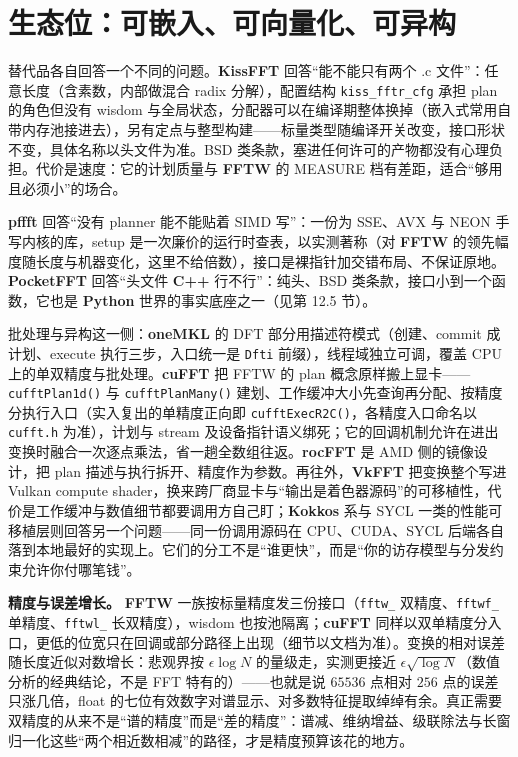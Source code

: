 \documentclass[12pt,a4paper,fontset=fandol]{ctexbook}
\newcommand{\Fn}[1]{\texttt{#1()}}
\newcommand{\Tp}[1]{\texttt{#1}}
\newcommand{\Lib}[1]{\textbf{#1}}
\newcommand{\Lang}[1]{\textsf{\bfseries #1}}
\newcommand{\CPP}{\Lang{C++}}
\newcommand{\PY}{\Lang{Python}}
\begin{document}
\section{生态位：可嵌入、可向量化、可异构}

替代品各自回答一个不同的问题。\Lib{KissFFT} 回答``能不能只有两个 .c 文件''：任意长度（含素数，内部做混合 radix 分解），配置结构 \Tp{kiss\_fftr\_cfg} 承担 plan 的角色但没有 wisdom 与全局状态，分配器可以在编译期整体换掉（嵌入式常用自带内存池接进去），另有定点与整型构建——标量类型随编译开关改变，接口形状不变，具体名称以头文件为准。BSD 类条款，塞进任何许可的产物都没有心理负担。代价是速度：它的计划质量与 \Lib{FFTW} 的 MEASURE 档有差距，适合``够用且必须小''的场合。

\Lib{pffft} 回答``没有 planner 能不能贴着 SIMD 写''：一份为 SSE、AVX 与 NEON 手写内核的库，setup 是一次廉价的运行时查表，以实测著称（对 \Lib{FFTW} 的领先幅度随长度与机器变化，这里不给倍数），接口是裸指针加交错布局、不保证原地。\Lib{PocketFFT} 回答``头文件 \CPP{} 行不行''：纯头、BSD 类条款，接口小到一个函数，它也是 \PY{} 世界的事实底座之一（见第 12.5 节）。

批处理与异构这一侧：\Lib{oneMKL} 的 DFT 部分用描述符模式（创建、commit 成计划、execute 执行三步，入口统一是 \Tp{Dfti} 前缀），线程域独立可调，覆盖 CPU 上的单双精度与批处理。\Lib{cuFFT} 把 FFTW 的 plan 概念原样搬上显卡——\Fn{cufftPlan1d} 与 \Fn{cufftPlanMany} 建划、工作缓冲大小先查询再分配、按精度分执行入口（实入复出的单精度正向即 \Fn{cufftExecR2C}，各精度入口命名以 \Tp{cufft.h} 为准），计划与 stream 及设备指针语义绑死；它的回调机制允许在进出变换时融合一次逐点乘法，省一趟全数组往返。\Lib{rocFFT} 是 AMD 侧的镜像设计，把 plan 描述与执行拆开、精度作为参数。再往外，\Lib{VkFFT} 把变换整个写进 Vulkan compute shader，换来跨厂商显卡与``输出是着色器源码''的可移植性，代价是工作缓冲与数值细节都要调用方自己盯；\Lib{Kokkos} 系与 SYCL 一类的性能可移植层则回答另一个问题——同一份调用源码在 CPU、CUDA、SYCL 后端各自落到本地最好的实现上。它们的分工不是``谁更快''，而是``你的访存模型与分发约束允许你付哪笔钱''。

\textbf{精度与误差增长。} \Lib{FFTW} 一族按标量精度发三份接口（\Tp{fftw\_} 双精度、\Tp{fftwf\_} 单精度、\Tp{fftwl\_} 长双精度），wisdom 也按池隔离；\Lib{cuFFT} 同样以双单精度分入口，更低的位宽只在回调或部分路径上出现（细节以文档为准）。变换的相对误差随长度近似对数增长：悲观界按 $\epsilon \log N$ 的量级走，实测更接近 $\epsilon \sqrt{\log N}$（数值分析的经典结论，不是 FFT 特有的）——也就是说 $65536$ 点相对 $256$ 点的误差只涨几倍，float 的七位有效数字对谱显示、对多数特征提取绰绰有余。真正需要双精度的从来不是``谱的精度''而是``差的精度''：谱减、维纳增益、级联除法与长窗归一化这些``两个相近数相减''的路径，才是精度预算该花的地方。
\end{document}
